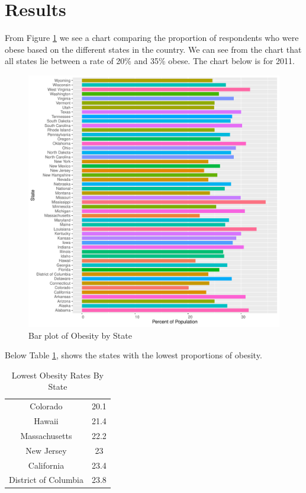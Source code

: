\documentclass[
]{article}
\begin{document}
\newpage

\hypertarget{Results}{%
\section{Results}\label{Results}}

From Figure \ref{fig:fig1} we see a chart comparing the proportion of respondents who were obese based on the different states in the country. We can see from the chart that all states lie between a rate of 20\% and 35\% obese. The chart below is for 2011.

\begin{figure}
\centering
\includegraphics{paper_files/figure-latex/fig1-1.pdf}
\caption{\label{fig:fig1}Bar plot of Obesity by State}
\end{figure}

Below Table \ref{tab:tab2}, shows the states with the lowest proportions of obesity.

\begin{table}[H]

\caption{\label{tab:tab2}Lowest Obesity Rates By State}
\centering
\begin{tabular}[t]{cc}
\toprule
Colorado & 20.1\\
Hawaii & 21.4\\
Massachusetts & 22.2\\
New Jersey & 23\\
California & 23.4\\
\addlinespace
District of Columbia & 23.8\\
\bottomrule
\end{tabular}
\end{table}
\end{document}
